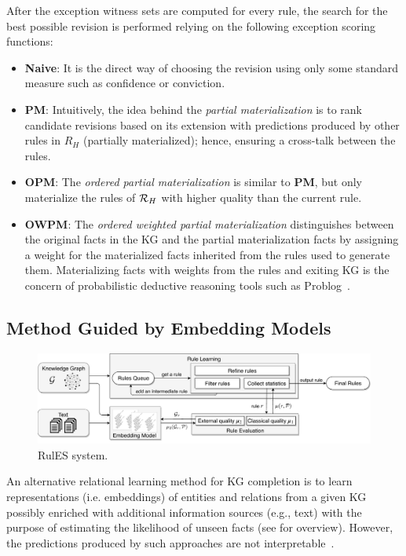 After the exception witness sets are computed for every rule, the search for the best possible revision is performed relying on the following exception scoring functions:
\begin{itemize}
\item \textbf{Naive}: It is the direct way of choosing the revision using only some standard measure such as confidence or conviction.
\item \textbf{PM}: Intuitively, the idea behind the \textit{partial materialization} is to rank candidate revisions based on its extension with predictions produced by other rules in $R_H$ (\ie partially materialized); hence, ensuring a cross-talk between the rules.
\item \textbf{OPM}: The \textit{ordered partial materialization} is similar to \textbf{PM}, but only materialize the rules of $\mathcal{R}_{H}$ with higher quality than the current rule.
\item \textbf{OWPM}: The \textit{ordered weighted partial materialization} distinguishes between the original facts in the KG and the partial materialization facts by assigning a weight for the materialized facts inherited from the rules used to generate them. Materializing facts with weights from the rules and exiting KG is the concern of probabilistic deductive reasoning tools such as Problog~\cite{problog2007,problog2015}.%
\end{itemize}



\subsection{Method Guided by Embedding Models}
  \begin{figure}[t]
\centering
\includegraphics[width=1\textwidth]{figures/rules_overview_H.pdf}
\caption{RulES system.}
\label{fig:system}
\end{figure}


An alternative relational learning method for KG completion is to learn representations (i.e. embeddings) of entities and relations from a given KG possibly enriched with additional information sources (e.g., text) with the purpose of estimating the likelihood of unseen facts (see \cite{Wang2017} for overview). However, the predictions produced by such approaches are not interpretable~\cite{Shakerin2018}. 

